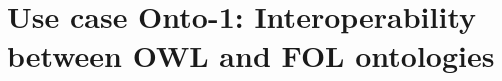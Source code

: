 \documentclass[10pt,%
\ifpretendfinal
final%
\else
draft%
\fi,
]{scrreprt}
\begin{document}
%
%
%
%
%
%
%

\section{Use case Onto-1: Interoperability between OWL and FOL ontologies}
\end{document}

